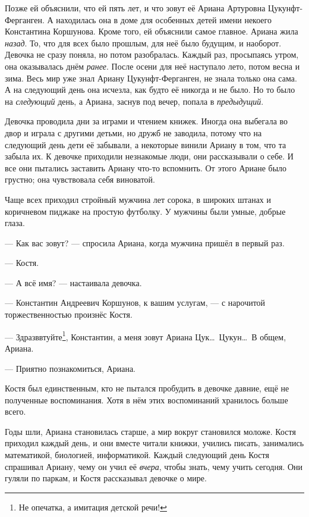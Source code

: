 \documentclass[openany, oneside]{book}
\begin{document}
Позже ей объяснили, что ей пять лет, и что зовут её Ариана Артуровна Цукунфт-Ферганген. А находилась она в доме для особенных детей имени некоего Константина Коршунова. Кроме того, ей объяснили самое главное. Ариана жила \textit{назад}. То, что для всех было прошлым, для неё было будущим, и наоборот. Девочка не сразу поняла, но потом разобралась. Каждый раз, просыпаясь утром, она оказывалась днём \textit{ранее}. После осени для неё наступало лето, потом весна и зима. Весь мир уже знал Ариану Цукунфт-Ферганген, не знала только она сама. А на следующий день она исчезла, как будто её никогда и не было. Но то было на \textit{следующий} день, а Ариана, заснув под вечер, попала в \textit{предыдущий}.

Девочка проводила дни за играми и чтением книжек. Иногда она выбегала во двор и играла с другими детьми, но дружб не заводила, потому что на следующий день дети её забывали, а некоторые винили Ариану в том, что та забыла их. К девочке приходили незнакомые люди, они рассказывали о себе. И все они пытались заставить Ариану что-то вспомнить. От этого Ариане было грустно; она чувствовала себя виноватой.

Чаще всех приходил стройный мужчина лет сорока, в широких штанах и коричневом пиджаке на простую футболку. У мужчины были умные, добрые глаза.

--- Как вас зовут? --- спросила Ариана, когда мужчина пришёл в первый раз.

--- Костя.

--- А всё имя? --- настаивала девочка.

--- Константин Андреевич Коршунов, к вашим услугам, --- с нарочитой торжественностью произнёс Костя.

--- Здразввтуйте\footnote{Не опечатка, а имитация детской речи!}, Константин, а меня зовут Ариана Цук\dots \ Цукун\dots \ В общем, Ариана.

--- Приятно познакомиться, Ариана.

Костя был единственным, кто не пытался пробудить в девочке давние, ещё не полученные воспоминания. Хотя в нём этих воспоминаний хранилось больше всего.

Годы шли, Ариана становилась старше, а мир вокруг становился моложе. Костя приходил каждый день, и они вместе читали книжки, учились писать, занимались математикой, биологией, информатикой. Каждый следующий день Костя спрашивал Ариану, чему он учил её \textit{вчера}, чтобы знать, чему учить сегодня. Они гуляли по паркам, и Костя рассказывал девочке о мире.
\end{document}
